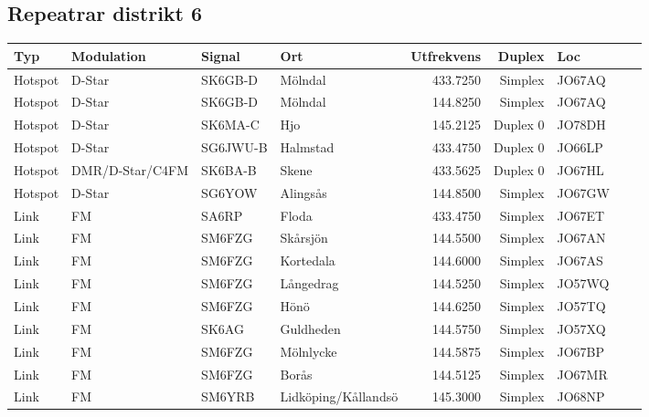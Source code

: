 \subsection{Repeatrar distrikt 6}

\begin{longtable}{llllrrlcl}
	Typ      & Modulation      & Signal   & Ort                   & Utfrekvens &   Duplex & Loc    &  &  \\ \hline
	Hotspot  & D-Star          & SK6GB-D  & Mölndal               &   433.7250 &  Simplex & JO67AQ &  &  \\
	Hotspot  & D-Star          & SK6GB-D  & Mölndal               &   144.8250 &  Simplex & JO67AQ &  &  \\
	Hotspot  & D-Star          & SK6MA-C  & Hjo                   &   145.2125 & Duplex 0 & JO78DH &  &  \\
	Hotspot  & D-Star          & SG6JWU-B & Halmstad              &   433.4750 & Duplex 0 & JO66LP &  &  \\
	Hotspot  & DMR/D-Star/C4FM & SK6BA-B  & Skene                 &   433.5625 & Duplex 0 & JO67HL &  &  \\
	Hotspot  & D-Star          & SG6YOW   & Alingsås              &   144.8500 &  Simplex & JO67GW &  &  \\
	Link     & FM              & SA6RP    & Floda                 &   433.4750 &  Simplex & JO67ET &  &  \\
	Link     & FM              & SM6FZG   & Skårsjön              &   144.5500 &  Simplex & JO67AN &  &  \\
	Link     & FM              & SM6FZG   & Kortedala             &   144.6000 &  Simplex & JO67AS &  &  \\
	Link     & FM              & SM6FZG   & Långedrag             &   144.5250 &  Simplex & JO57WQ &  &  \\
	Link     & FM              & SM6FZG   & Hönö                  &   144.6250 &  Simplex & JO57TQ &  &  \\
	Link     & FM              & SK6AG    & Guldheden             &   144.5750 &  Simplex & JO57XQ &  &  \\
	Link     & FM              & SM6FZG   & Mölnlycke             &   144.5875 &  Simplex & JO67BP &  &  \\
	Link     & FM              & SM6FZG   & Borås                 &   144.5125 &  Simplex & JO67MR &  &  \\
	Link     & FM              & SM6YRB   & Lidköping/Kållandsö   &   145.3000 &  Simplex & JO68NP &  &  \\

\end{longtable}
